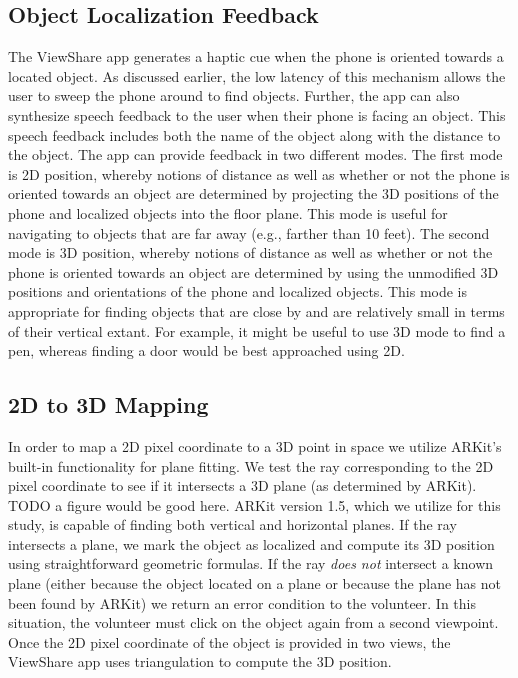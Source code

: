 \documentclass[chi_draft]{sigchi}
\begin{document}
\subsection{Object Localization Feedback}
The ViewShare app generates a haptic cue when the phone is oriented towards a located object.  As discussed earlier, the low latency of this mechanism allows the user to sweep the phone around to find objects.  Further, the app can also synthesize speech feedback to the user when their phone is facing an object.  This speech feedback includes both the name of the object along with the distance to the object.  The app can provide feedback in two different modes.  The first mode is 2D position, whereby notions of distance as well as whether or not the phone is oriented towards an object are determined by projecting the 3D positions of the phone and localized objects into the floor plane.  This mode is useful for navigating to objects that are far away (e.g., farther than 10 feet).  The second mode is 3D position, whereby notions of distance as well as whether or not the phone is oriented towards an object are determined by using the unmodified 3D positions and orientations of the phone and localized objects.  This mode is appropriate for finding objects that are close by and are relatively small in terms of their vertical extant.  For example, it might be useful to use 3D mode to find a pen, whereas finding a door would be best approached using 2D.

\subsection{2D to 3D Mapping}
In order to map a 2D pixel coordinate to a 3D point in space we utilize ARKit's built-in functionality for plane fitting.  We test the ray corresponding to the 2D pixel coordinate to see if it intersects a 3D plane (as determined by ARKit).  TODO a figure would be good here.  ARKit version 1.5, which we utilize for this study, is capable of finding both vertical and horizontal planes.  If the ray intersects a plane, we mark the object as localized and compute its 3D position using straightforward geometric formulas.  If the ray \emph{does not} intersect a known plane (either because the object located on a plane or because the plane has not been found by ARKit) we return an error condition to the volunteer.  In this situation, the volunteer must click on the object again from a second viewpoint.  Once the 2D pixel coordinate of the object is provided in two views, the ViewShare app uses triangulation to compute the 3D position.
\end{document}
